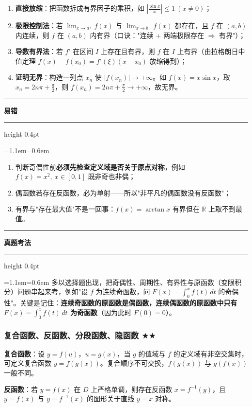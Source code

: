 \documentclass[11pt,openany,UTF8]{ctexbook}
\newcommand{\callouthead}[2]{%
  \par\addvspace{7pt}\noindent
  {\color{#1}\rule[-0.15em]{3pt}{1.05em}}\hspace{0.5em}%
  {\bfseries\color{#1}#2}\par\nobreak\vspace{-0.35em}%
  {\color{rulesep}\hrule height 0.4pt}\nobreak\vspace{0.45em}%
  \begingroup\small\setlength{\parindent}{0pt}%
  \leftskip=1.1em\rightskip=0.6em\noindent\ignorespaces}
\newcommand{\calloutend}{\par\endgroup\addvspace{7pt}}
\newenvironment{callwarn}[1]{\callouthead{warnbar}{#1}}{\calloutend}
\newenvironment{callexam}[1]{\callouthead{exambar}{#1}}{\calloutend}
\begin{document}
\begin{enumerate}
\item \textbf{直接放缩}：把函数拆成有界因子的乘积，如 $\left\vert\frac{\sin x}{x}\right\vert\le 1\ (x\ne 0)$；
\item \textbf{极限控制法}：若 $\lim_{x\to a^+}f(x)$ 与 $\lim_{x\to b^-}f(x)$ 都存在，且 $f$ 在 $(a,b)$ 内连续，则 $f$ 在 $(a,b)$ 内有界（口诀："连续 + 两端极限存在 $\Rightarrow$ 有界"）；
\item \textbf{导数有界法}：若 $f'$ 在区间 $I$ 上存在且有界，则 $f$ 在 $I$ 上有界（由拉格朗日中值定理 $f(x)-f(x_0)=f'(\xi)(x-x_0)$ 放缩得到）；
\item \textbf{证明无界}：构造一列点 $x_n$ 使 $\vert f(x_n)\vert\to+\infty$。如 $f(x)=x\sin x$，取 $x_n=2n\pi+\frac{\pi}{2}$，则 $f(x_n)=2n\pi+\frac{\pi}{2}\to+\infty$，故无界。
\end{enumerate}
\begin{callwarn}{易错}
\begin{enumerate}
\item 判断奇偶性前\textbf{必须先检查定义域是否关于原点对称}，例如 $f(x)=x^2,\ x\in[0,1]$ 既非奇也非偶；
\item 偶函数若存在反函数，必为单射——所以"非平凡的偶函数没有反函数"；
\item 有界与"存在最大值"不是一回事：$f(x)=\arctan x$ 有界但在 $\mathbb{R}$ 上取不到最值。
\end{enumerate}
\end{callwarn}

\begin{callexam}{真题考法}
多以选择题出现，把奇偶性、周期性、有界性与原函数（变限积分）问题串起来考，例如"设 $f$ 为连续奇函数，问 $F(x)=\int_0^x f(t)\,dt$ 的奇偶性"。关键是记住：\textbf{连续奇函数的原函数是偶函数，连续偶函数的原函数中只有 $F(x)=\int_0^x f(t)\,dt$ 为奇函数}（因为此时 $F(0)=0$）。

\end{callexam}

\subsubsection{复合函数、反函数、分段函数、隐函数 $\bigstar$$\bigstar$}

\textbf{复合函数}：设 $y=f(u)$，$u=g(x)$，当 $g$ 的值域与 $f$ 的定义域有非空交集时，可定义复合函数 $y=f(g(x))$。复合顺序不可交换，$f(g(x))$ 与 $g(f(x))$ 一般不同。

\textbf{反函数}：若 $y=f(x)$ 在 $D$ 上严格单调，则存在反函数 $x=f^{-1}(y)$，且 $y=f(x)$ 与 $y=f^{-1}(x)$ 的图形关于直线 $y=x$ 对称。
\end{document}
